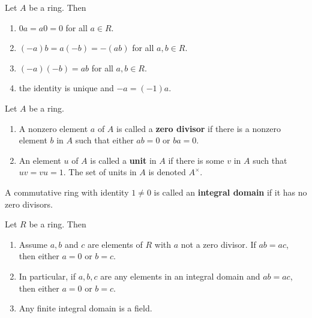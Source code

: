 \begin{proposition}
    Let $A$ be a ring. Then
    \begin{enumerate}
        \item
              $0 a=a 0=0$ for all $a \in R$.
        \item  $(-a) b=a(-b)=-(a b)$ for all $a, b \in R$.
        \item
              $(-a)(-b)=a b$ for all $a, b \in R$.
        \item
              the identity is unique and $-a=(-1) a$.
    \end{enumerate}
\end{proposition}


\begin{definition}
    Let $A$ be a ring.
    \begin{enumerate}
        \item
              A nonzero element $a$ of $A$ is called a \textbf{zero divisor} if there is a nonzero element $b$ in $A$ such that either $a b=0$ or $b a=0$.

        \item
              An element $u$ of $A$ is called a \textbf{unit} in $A$ if there is some $v$ in $A$ such that $u v=v u=1$. The set of units in $A$ is denoted $A^{\times}$.
    \end{enumerate}
\end{definition}


\begin{definition} %
    A commutative ring with identity $1 \neq 0$ is called an \textbf{integral domain} if it has no zero divisors.
\end{definition}

\begin{proposition} %
    Let $R$ be a ring. Then
    \begin{enumerate}
        \item
              Assume $a, b$ and $c$ are elements of $R$ with $a$ not a zero divisor. If $a b=a c$, then either $a=0$ or $b=c$.

        \item In particular, if $a, b, c$ are any elements in an integral domain and $a b=a c$, then either $a=0$ or $b=c$.

        \item Any finite integral domain is a field.
    \end{enumerate}
\end{proposition}

